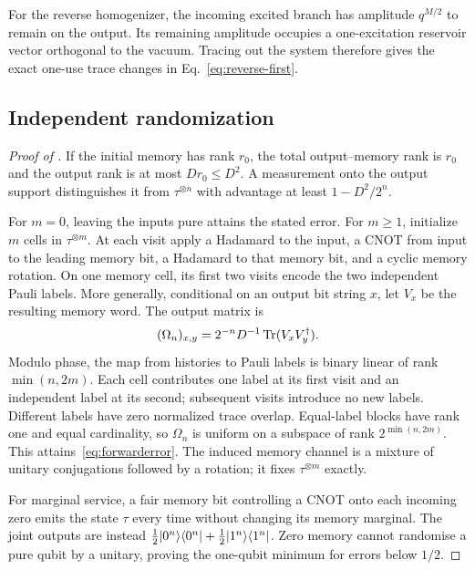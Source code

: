 For the reverse homogenizer, the incoming excited branch has amplitude $q^{M/2}$ to remain on the output. Its remaining amplitude occupies a one-excitation reservoir vector orthogonal to the vacuum. Tracing out the system therefore gives the exact one-use trace changes in Eq.~\eqref{eq:reverse-first}.

\subsection{Independent randomization}
\begin{proof}[Proof of ]
If the initial memory has rank $r_0$, the total output--memory rank is $r_0$ and the output rank is at most $Dr_0\le D^2$. A measurement onto the output support distinguishes it from $\tau^{\otimes n}$ with advantage at least $1-D^2/2^n$.

For $m=0$, leaving the inputs pure attains the stated error. For $m\ge1$, initialize $m$ cells in $\tau^{\otimes m}$. At each visit apply a Hadamard to the input, a CNOT from input to the leading memory bit, a Hadamard to that memory bit, and a cyclic memory rotation. On one memory cell, its first two visits encode the two independent Pauli labels. More generally, conditional on an output bit string $x$, let $V_x$ be the resulting memory word. The output matrix is
\begin{equation}
 (\Omega_n)_{x,y}=2^{-n}D^{-1}\operatorname{Tr}(V_xV_y^\dagger).
 \label{eq:gram}
\end{equation}
Modulo phase, the map from histories to Pauli labels is binary linear of rank $\min(n,2m)$. Each cell contributes one label at its first visit and an independent label at its second; subsequent visits introduce no new labels. Different labels have zero normalized trace overlap. Equal-label blocks have rank one and equal cardinality, so $\Omega_n$ is uniform on a subspace of rank $2^{\min(n,2m)}$. This attains~\eqref{eq:forwarderror}. The induced memory channel is a mixture of unitary conjugations followed by a rotation; it fixes $\tau^{\otimes m}$ exactly.

For marginal service, a fair memory bit controlling a CNOT onto each incoming zero emits the state $\tau$ every time without changing its memory marginal. The joint outputs are instead $\tfrac12|0^n\rangle\langle0^n|+\tfrac12|1^n\rangle\langle1^n|$. Zero memory cannot randomise a pure qubit by a unitary, proving the one-qubit minimum for errors below $1/2$.
\end{proof}

